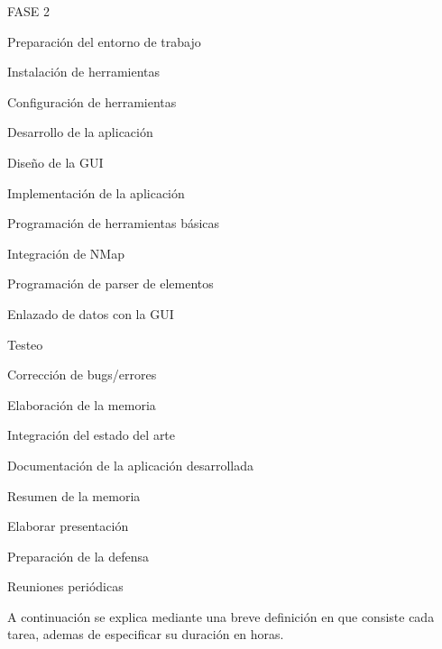 \begin{numbered}
	\item FASE 2
	\begin{numbered}
		\item Preparación del entorno de trabajo
		\begin{numbered}
			\item Instalación de herramientas
			\item Configuración de herramientas
		\end{numbered}
		
		\item Desarrollo de la aplicación
		\begin{numbered}
			\item Diseño de la GUI
			\item Implementación de la aplicación
			\begin{numbered}
				\item Programación de herramientas básicas
				\item Integración de NMap
				\item Programación de parser de elementos
				\item Enlazado de datos con la GUI
			\end{numbered}
			\item Testeo
			\item Corrección de bugs/errores
		\end{numbered}
	\end{numbered}
	
	\item Elaboración de la memoria
	\begin{numbered}
		\item Integración del estado del arte
		\item Documentación de la aplicación desarrollada
		\item Resumen de la memoria
		\item Elaborar presentación
		\item Preparación de la defensa
	\end{numbered}
	
	\item Reuniones periódicas
\end{numbered}

A continuación se explica mediante una breve definición en que consiste cada tarea, ademas de especificar su duración en horas.

